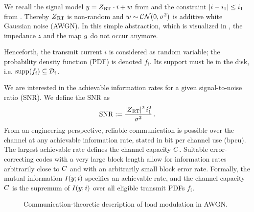 We recall the signal model $y = Z_{\hspace{.2mm}\mathrm{RT}} \cdot i + w$ from  and the constraint $|i - i_1| \leq i_1$ from . Thereby $Z_{\hspace{.2mm}\mathrm{RT}}$ is non-random and $w \sim \mathcal{CN}(0,\sigma^2)$ is additive white Gaussian noise (AWGN). In this simple abstraction, which is visualized in , the impedance $z$ and the map $g$ do not occur anymore.

Henceforth, the transmit current $i$ is considered as random variable; the probability density function (PDF) is denoted $f_i$. Its support must lie in the disk, i.e. $\operatorname*{supp}(f_{i}) \subseteq \mathcal{D}_i$.

We are interested in the achievable information rates for a given signal-to-noise ratio (SNR). We define the SNR as
\begin{align}
\mathrm{SNR} := \frac{|Z_{\hspace{.2mm}\mathrm{RT}}|^2 \, i_1^2}{\sigma^2}
\, . \label{eq:SNR}
\end{align}
From an engineering perspective, reliable communication is possible over the channel at any achievable information rate, stated in bit per channel use (bpcu). The largest achievable rate defines the channel capacity $C$. Suitable error-correcting codes with a very large block length allow for information rates arbitrarily close to $C$ and with an arbitrarily small block error rate.
Formally, the mutual information $I(y;i)$ specifies an achievable rate, and the channel capacity $C$ is the supremum of $I(y;i)$ over all eligible transmit PDFs $f_i$. \cite{Tse2005}

\begin{figure}[t]
\centering

\caption{Communication-theoretic description of load modulation in AWGN.}
\label{fig:BlockDiagram}
\end{figure}



